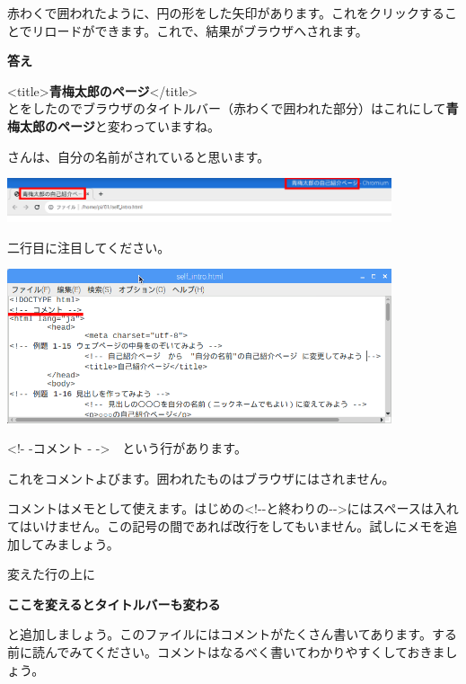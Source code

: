 \documentclass[a4paper,12pt]{jarticle}
\begin{document}
\flushleft
赤わくで囲われたように、円の形をした矢印があります。これをクリックすることでリロードができます。これで、結果がブラウザへされます。

\vfill
\clearpage
\textbf{答え}


{\textless}title{\textgreater}\textbf{青梅太郎のページ}{\textless}/title{\textgreater}\\
とをしたのでブラウザのタイトルバー（赤わくで囲われた部分）はこれにして\textbf{青梅太郎のページ}と変わっていますね。

さんは、自分の名前がされていると思います。

\centering
\includegraphics[width=0.85\textwidth]{textbook-img152.png}
\flushleft


二行目に注目してください。

\centering
\includegraphics[width=0.85\textwidth]{textbook-img151.png}
\flushleft



\bigskip

{\textless}!- -コメント -
-{\textgreater}　という行があります。

これをコメントよびます。囲われたものはブラウザにはされません。

コメントはメモとして使えます。はじめの{\textless}!-{}-と終わりの{}-{}-{\textgreater}にはスペースは入れてはいけません。この記号の間であれば改行をしてもいません。試しにメモを追加してみましょう。

変えた行の上に

\textbf{ここを変えるとタイトルバーも変わる
}

と追加しましょう。このファイルにはコメントがたくさん書いてあります。する前に読んでみてください。コメントはなるべく書いてわかりやすくしておきましょう。
\end{document}
